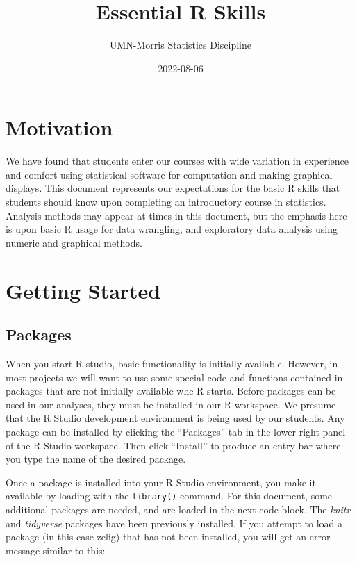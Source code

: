 \documentclass[
]{book}
\title{Essential R Skills}
\author{UMN-Morris Statistics Discipline}
\date{2022-08-06}
\begin{document}
\maketitle

{
\setcounter{tocdepth}{1}
\tableofcontents
}
\hypertarget{motivation}{%
\chapter{Motivation}\label{motivation}}

We have found that students enter our courses with wide variation in experience and comfort using statistical software for computation and making graphical displays. This document represents our expectations for the basic R skills that students should know upon completing an introductory course in statistics. Analysis methods may appear at times in this document, but the emphasis here is upon basic R usage for data wrangling, and exploratory data analysis using numeric and graphical methods.

\hypertarget{GettingStarted}{%
\chapter{Getting Started}\label{GettingStarted}}

\hypertarget{packages}{%
\section{Packages}\label{packages}}

When you start R studio, basic functionality is initially available. However, in most projects we will want to use some special code and functions contained in packages that are not initially available whe R starts. Before packages can be used in our analyses, they must be installed in our R workspace. We presume that the R Studio development environment is being used by our students. Any package can be installed by clicking the ``Packages'' tab in the lower right panel of the R Studio workspace. Then click ``Install'' to produce an entry bar where you type the name of the desired package.

Once a package is installed into your R Studio environment, you make it available by loading with the \texttt{library()} command. For this document, some additional packages are needed, and are loaded in the next code block. The \emph{knitr} and \emph{tidyverse} packages have been previously installed. If you attempt to load a package (in this case zelig) that has not been installed, you will get an error message similar to this:
\end{document}
